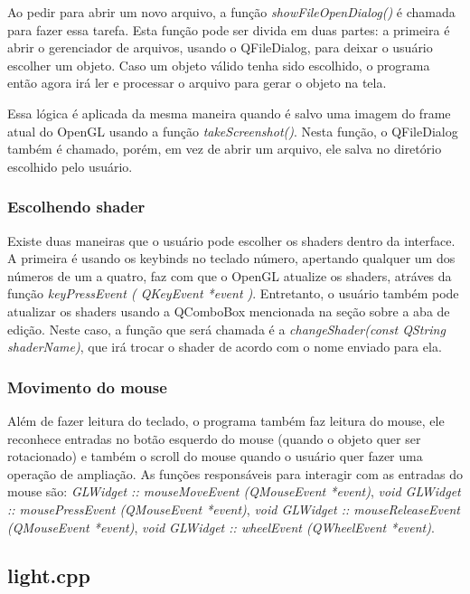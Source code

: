 Ao pedir para abrir um novo arquivo, a função \emph{showFileOpenDialog()} é chamada para fazer essa tarefa.
Esta função pode ser divida em duas partes: a primeira é abrir o gerenciador de arquivos, usando o 
QFileDialog, para deixar o usuário escolher um objeto. Caso um objeto válido tenha sido escolhido, 
o programa então agora irá ler e processar o arquivo para gerar o objeto na tela.

Essa lógica é aplicada da mesma maneira quando é salvo uma imagem do frame atual do OpenGL usando a 
função \emph{takeScreenshot()}. Nesta função, o QFileDialog também é chamado, porém, em vez de abrir um 
arquivo, ele salva no diretório escolhido pelo usuário.

\subsubsection{Escolhendo shader}

Existe duas maneiras que o usuário pode escolher os shaders dentro da interface. A primeira é usando 
os keybinds no teclado número, apertando qualquer um dos números de um a quatro, faz com que o 
OpenGL atualize os shaders, atráves da função \emph{keyPressEvent ( QKeyEvent *event )}. Entretanto, 
o usuário também pode atualizar os shaders usando a QComboBox mencionada na seção sobre a aba de edição.
Neste caso, a função que será chamada é a \emph{changeShader(const QString shaderName)}, que irá trocar 
o shader de acordo com o nome enviado para ela.

\subsubsection{Movimento do mouse}

Além de fazer leitura do teclado, o programa também faz leitura do mouse, ele 
reconhece entradas no botão esquerdo do mouse (quando o objeto quer ser rotacionado) e também o scroll do mouse 
quando o usuário quer fazer uma operação de ampliação. As funções responsáveis para interagir com as entradas do mouse
são: \emph{GLWidget :: mouseMoveEvent (QMouseEvent *event)}, \emph{void GLWidget :: mousePressEvent (QMouseEvent *event)},
\emph{void GLWidget :: mouseReleaseEvent (QMouseEvent *event)}, \emph{void GLWidget :: wheelEvent (QWheelEvent *event)}.


\subsection{light.cpp}

